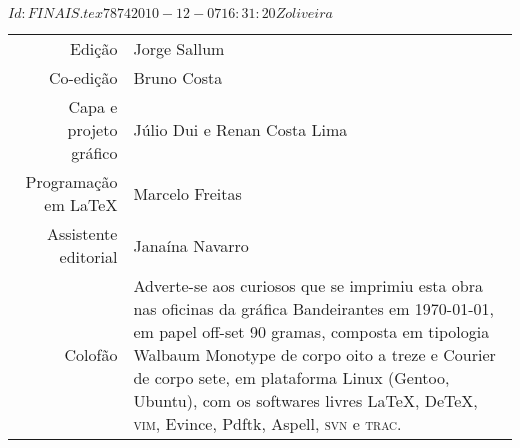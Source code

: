 \SVN $Id: FINAIS.tex 7874 2010-12-07 16:31:20Z oliveira $



\newcommand{\putline}[2]{#1 & #2\\}



\paginabranca

\noindent\begin{tabular}{rp{}}
\small
\putline{Edição}{Jorge Sallum}
		\putline{Co-edição}{Bruno Costa}
		\putline{Capa e projeto gráfico}{Júlio Dui e Renan Costa Lima}
		\putline{Programação em LaTeX}{Marcelo Freitas}
		\putline{Assistente editorial}{Janaína Navarro}
		\putline{Colofão}{Adverte-se aos curiosos que se
			imprimiu esta obra nas oficinas da gráfica
			Bandeirantes em \today, em papel 
			\mbox{off-set} 90 gramas,
			composta em tipologia Walbaum Monotype de 
			corpo oito a treze e Courier de corpo sete, 
			em plataforma Linux (Gentoo, Ubuntu), 
			com os softwares livres 
			\LaTeX, De\TeX, \textsc{vim}, Evince, Pdftk, 
			Aspell, \textsc{svn} e \textsc{trac}.}
\end{tabular}

